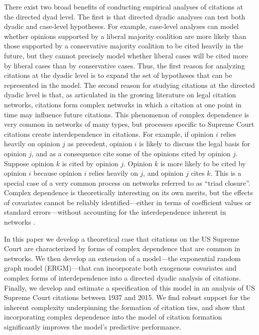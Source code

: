 \documentclass[headsepline=true, abstracton]{scrartcl}
\begin{document}
There exist two broad benefits of conducting empirical analyses of citations at the directed dyad level. The first is that directed dyadic analyses can test both dyadic and case-level hypotheses. For example, case-level analyses can model whether opinions supported by a liberal majority coalition are more likely than those supported by a conservative majority coalition to be cited heavily in the future, but they cannot precisely model whether liberal cases will be cited more by liberal cases than by conservative cases. Thus, the first reason for analyzing citations at the dyadic level is to expand the set of hypotheses that can be represented in the model. The second reason for studying citations at the directed dyadic level is that, as articulated in the growing literature on legal citation networks, citations form complex networks in which a citation at one point in time may influence future citations. This phenomenon of complex dependence is very common in networks of many types, but processes specific to Supreme Court citations create interdependence in citations. For example, if opinion $i$ relies heavily on opinion $j$ as precedent, opinion $i$ is likely to discuss the legal basis for opinion $j$, and as a consequence cite some of the opinions cited by opinion $j$. Suppose opinion $k$ is cited by opinion $j$. Opinion $k$ is more likely to be cited by opinion $i$ because opinion $i$ relies heavily on $j$, and opinion $j$ cites $k$.  This is a special case of a very common process on networks referred to as ``triad closure''. Complex dependence is theoretically interesting on its own merits, but the effects of covariates cannot be reliably identified---either in terms of coefficient values or standard errors---without accounting for the interdependence inherent in networks \citep{desmaraisstatistical}. 

In this paper we develop a theoretical case that citations on the US Supreme Court are characterized by forms of complex dependence that are common in networks. We then develop an extension of a model---the exponential random graph model (ERGM)---that can incorporate both exogenous covariates and complex forms of interdependence into a directed dyadic analysis of citations. Finally, we develop and estimate a specification of this model in an analysis of US Supreme Court citations between 1937 and 2015. We find robust support for the inherent complexity underpinning the formation of citation ties, and show that incorporating complex dependence into the model of citation formation significantly improves the model's predictive performance.
\end{document}
